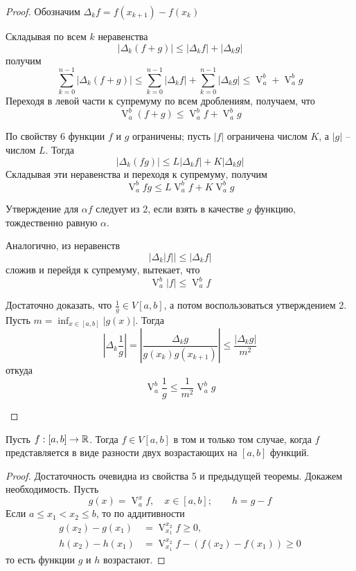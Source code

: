 \begin{proof}
	Обозначим $\Delta_k f = f(x_{k + 1}) - f(x_k)$
	
	\begin{MyList}
		\item Складывая по всем $k$ неравенства
		\[|\Delta_k(f + g)| \leqslant |\Delta_k f| + |\Delta_k g|\]
		получим
		\[\sum_{k = 0}^{n - 1} |\Delta_k (f + g)| \leqslant \sum_{k = 0}^{n - 1} |\Delta_k f| + \sum_{k = 0}^{n - 1} |\Delta_k g| \leqslant \mathop{V}_a^b + \mathop{V}_a^b g\]
		Переходя в левой части к супремуму по всем дроблениям, получаем, что 
		\[\mathop{V}_a^b (f + g) \leqslant \mathop{V}_a^b f + \mathop{V}_a^b g\]

		\item По свойству 6 функции $f$ и $g$ ограничены; пусть $|f|$ ограничена числом $K$, а $|g|$ -- числом $L$.
		Тогда
		\[|\Delta_k (fg)| \leqslant L |\Delta_k f| + K|\Delta_k g|\]
		Складывая эти неравенства и переходя к супремуму, получим
		\[\mathop{V}_a^b fg \leqslant L \mathop{V}_a^b f + K\mathop{V}_a^b g\]

		\item Утверждение для $\alpha f$ следует из 2, если взять в качестве $g$ функцию, тождественно равную $\alpha$.
		\item Аналогично, из неравенств
		\[\left|\Delta_k |f|\right| \leqslant |\Delta_k f|\]
		сложив и перейдя к супремуму, вытекает, что
		\[\mathop{V}_a^b |f| \leqslant \mathop{V}_a^b f\]	

		\item Достаточно доказать, что $\frac{1}{g} \in V[a, b]$, а потом воспользоваться утверждением 2. Пусть $m = \displaystyle{\inf_{x \in [a, b]} |g(x)|}$.
		Тогда 
		\[\left| \Delta_k \frac{1}{g}\right| = \left| \frac{\Delta_k g}{g(x_k) g(x_{k + 1})}\right| \leqslant \frac{|\Delta_k g|}{m^2}\]
		откуда
		\[\mathop{V}_a^b \frac{1}{g} \leqslant \frac{1}{m^2} \mathop{V}_a^b g\]	
	\end{MyList}
\end{proof}

\begin{Thm} \label{thm:33}
	Пусть $f : [a, b] \to \mathbb{R}$. Тогда $f \in V[a, b]$ в том и только том случае,
	когда $f$ представляется в виде разности двух возрастающих на $[a, b]$ функций.
\end{Thm}

\begin{proof}
	Достаточность очевидна из свойства 5 и предыдущей теоремы.
	Докажем необходимость. Пусть
	\[g(x) = \mathop{V}_a^x f, \quad x \in [a, b]; \qquad h = g - f\]
	Если $a \leqslant x_1 < x_2 \leqslant b$, то по аддитивности
	\begin{align*}
		g(x_2) - g(x_1) &= \mathop{V}_{x_1}^{x_2} f \geqslant 0, \\
		h(x_2) - h(x_1) &= \mathop{V}_{x_1}^{x_2} f - \left(f(x_2) - f(x_1)\right) \geqslant 0
	\end{align*}
	то есть функции $g$ и $h$ возрастают.
\end{proof}

